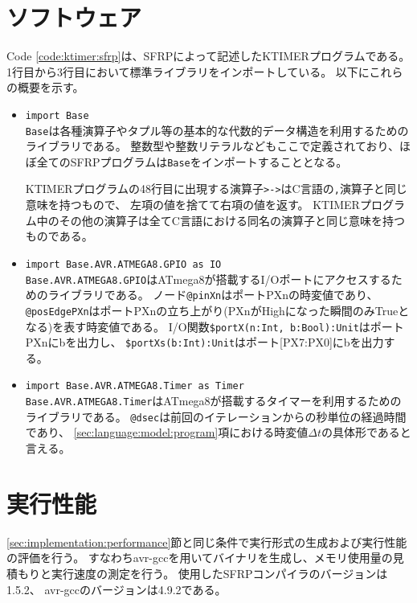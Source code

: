 \clearpage
\section{ソフトウェア}
Code \ref{code:ktimer:sfrp}は、SFRPによって記述したKTIMERプログラムである。
1行目から3行目において標準ライブラリをインポートしている。
以下にこれらの概要を示す。

\begin{itemize}
  \item \texttt{import Base}\\
  \texttt{Base}は各種演算子やタプル等の基本的な代数的データ構造を利用するためのライブラリである。
  整数型や整数リテラルなどもここで定義されており、ほぼ全てのSFRPプログラムは\texttt{Base}をインポートすることとなる。

  KTIMERプログラムの48行目に出現する演算子\texttt{>->}はC言語の\texttt{,}演算子と同じ意味を持つもので、
  左項の値を捨てて右項の値を返す。
  KTIMERプログラム中のその他の演算子は全てC言語における同名の演算子と同じ意味を持つものである。

  \item \texttt{import Base.AVR.ATMEGA8.GPIO as IO}\\
  \texttt{Base.AVR.ATMEGA8.GPIO}はATmega8が搭載するI/Oポートにアクセスするためのライブラリである。
  ノード\texttt{@pinXn}はポートPXnの時変値であり、
  \texttt{@posEdgePXn}はポートPXnの立ち上がり(PXnがHighになった瞬間のみTrueとなる)を表す時変値である。
  I/O関数\texttt{\$portX(n:Int, b:Bool):Unit}はポートPXnにbを出力し、
  \texttt{\$portXs(b:Int):Unit}はポート[PX7:PX0]にbを出力する。

  \item \texttt{import Base.AVR.ATMEGA8.Timer as Timer}\\
  \texttt{Base.AVR.ATMEGA8.Timer}はATmega8が搭載するタイマーを利用するためのライブラリである。
  \texttt{@dsec}は前回のイテレーションからの秒単位の経過時間であり、
  \ref{sec:language:model:program}項における時変値$\Delta t$の具体形であると言える。
\end{itemize}


\clearpage


\section{実行性能}
\ref{sec:implementation:performance}節と同じ条件で実行形式の生成および実行性能の評価を行う。
すなわちavr-gccを用いてバイナリを生成し、メモリ使用量の見積もりと実行速度の測定を行う。
使用したSFRPコンパイラのバージョンは1.5.2、
avr-gccのバージョンは4.9.2である。

